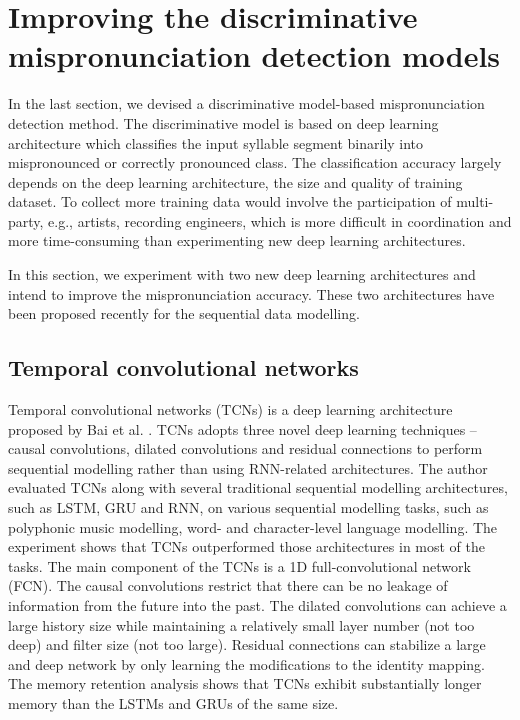 \section{Improving the discriminative mispronunciation detection models}

In the last section, we devised a discriminative model-based mispronunciation detection method. The discriminative model is based on deep learning architecture which classifies the input syllable segment binarily into mispronounced or correctly pronounced class. The classification accuracy largely depends on the deep learning architecture, the size and quality of training dataset. To collect more training data would involve the participation of multi-party, e.g., artists, recording engineers, which is more difficult in coordination and more time-consuming than experimenting new deep learning architectures. 

In this section, we experiment with two new deep learning architectures and intend to improve the mispronunciation accuracy. These two architectures have been proposed recently for the sequential data modelling.

\subsection{Temporal convolutional networks}

Temporal convolutional networks (TCNs) is a deep learning architecture proposed by Bai et al. \cite{Bai2018}. TCNs adopts three novel deep learning techniques -- causal convolutions, dilated convolutions and residual connections to perform sequential modelling rather than using RNN-related architectures. The author evaluated TCNs along with several traditional sequential modelling architectures, such as LSTM, GRU and RNN, on various sequential modelling tasks, such as polyphonic music modelling, word- and character-level language modelling. The experiment shows that TCNs outperformed those architectures in most of the tasks. The main component of the TCNs is a 1D full-convolutional network (FCN). The causal convolutions restrict that there can be no leakage of information from the future into the past. The dilated convolutions can achieve a large history size while maintaining a relatively small layer number (not too deep) and filter size (not too large). Residual connections can stabilize a large and deep network by only learning the modifications to the identity mapping. The memory retention analysis shows that TCNs exhibit substantially longer memory than the LSTMs and GRUs of the same size.

